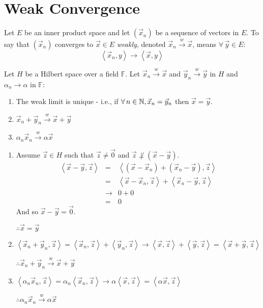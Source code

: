 \documentclass[letterpaper,12pt,fleqn]{article}
\newcommand{\vx}{\vec{x}}
\newcommand{\vy}{\vec{y}}
\newcommand{\vz}{\vec{z}}
\newcommand{\vo}{\vec{0}}
\newcommand{\inner}[1]{\left<#1\right>}
\newcommand{\weak}{\overset{w}{\longrightarrow}}
\renewcommand{\a}{\alpha}
\newcommand{\F}{\mathbb{F}}
\begin{document}
\section*{Weak Convergence}

\begin{definition}
  Let $E$ be an inner product space and let $(\vx_n)$ be a sequence of vectors
  in $E$. To say that $(\vx_n)$ converges to $\vx\in E$ \emph{weakly}, denoted
  $\vx_n\weak\vx$, means $\forall\,\vy\in E$:
  \[\inner{\vx_n,y}\to\inner{\vx,y}\]
\end{definition}

\begin{properties}
  Let $H$ be a Hilbert space over a field $\F$. Let $\vx_n\weak\vx$ and
  $\vy_n\weak\vy$ in $H$ and $\a_n\to\a$ in $\F$:
  \begin{enumerate}
  \item The weak limit is unique - i.e., if $\forall\,n\in\N,\vx_n=\vy_n$
    then $\vx=\vy$.
  \item $\vx_n+\vy_n\weak\vx+\vy$
  \item $\a_n\vx_n\weak\a\vx$
  \end{enumerate}
\end{properties}

\begin{theproof}
  \listbreak
  \begin{enumerate}
    \item Assume $\vz\in H$ such that $\vz\ne\vo$ and $\vz\not\perp(\vx-\vy)$.
      \begin{eqnarray*}
        \inner{\vx-\vy,\vz} &=& \inner{(\vx-\vx_n)+(\vx_n-\vy),\vz} \\
        &=& \inner{\vx-\vx_n,\vz}+\inner{\vx_n-\vy,\vz} \\
        &\to& 0+0 \\
        &=& 0
      \end{eqnarray*}
      And so $\vx-\vy=\vo$.

      $\therefore\vx=\vy$

    \item $\inner{\vx_n+\vy_n,\vz}=\inner{\vx_n,\vz}+\inner{\vy_n,\vz}\to
      \inner{\vx,\vz}+\inner{\vy,\vz}=\inner{\vx+\vy,\vz}$

      $\therefore\vx_n+\vy_n\weak\vx+\vy$

    \item $\inner{\a_n\vx_n,\vz}=\a_n\inner{\vx_n,\vz}\to\a\inner{\vx,\vz}=
      \inner{\a\vx,\vz}$

      $\therefore\a_n\vx_n\weak\a\vx$
  \end{enumerate}
\end{theproof}
\end{document}
